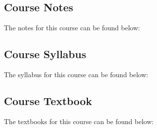 \subsection{Course Notes}

The notes for this course can be found below:

\subsection{Course Syllabus}

The syllabus for this course can be found below: \coursedoc{\CSPBAISyllabus}

\subsection{Course Textbook}

The textbooks for this course can be found below: \coursedoc{\CSPBAITextbook} \coursedoc{\CSPBRLTextbook}